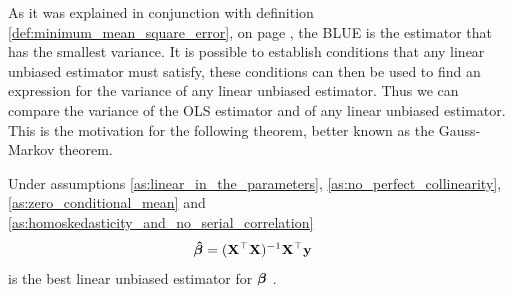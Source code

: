 As it was explained in conjunction with definition \ref{def:minimum_mean_square_error}, on page \pageref{def:minimum_mean_square_error}, the BLUE is the estimator that has the smallest variance.
It is possible to establish conditions that any linear unbiased estimator must satisfy, these conditions can then be used to find an expression for the variance of any linear unbiased estimator.
Thus we can compare the variance of the OLS estimator and of any linear unbiased estimator.
This is the motivation for the following theorem, better known as the Gauss-Markov theorem.
\begin{theorem}
    Under assumptions \ref{as:linear_in_the_parameters}, \ref{as:no_perfect_collinearity}, \ref{as:zero_conditional_mean} and \ref{as:homoskedasticity_and_no_serial_correlation} 
    \begin{align}\label{eq:betahat_y}
        \operatorname{\boldsymbol{\hat{\beta}}} &= (\mathbf{X}^\top\mathbf{X})^{-1}\mathbf{X}^\top\mathbf{y}
    \end{align}
    is the best linear unbiased estimator for $\operatorname{\boldsymbol{\beta}}$ \cite[p. 811]{Wooldridge2012}.
\end{theorem}\label{th:gauss_markoc_theorem}
